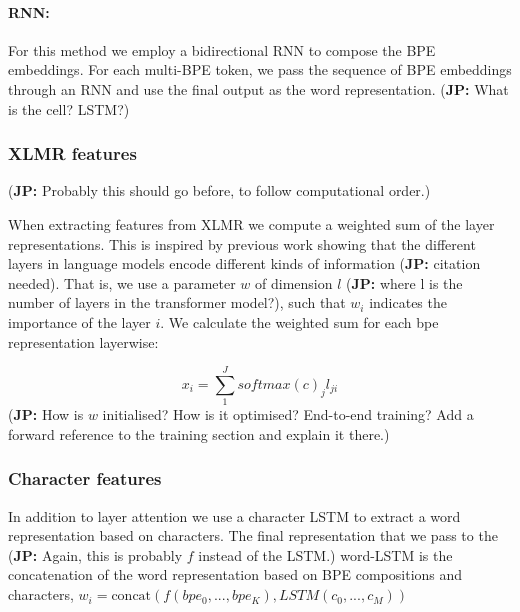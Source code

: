 \documentclass[11pt]{article}
\newcommand\jp[1]{(\textbf{JP:} #1)}
\begin{document}
	
	\paragraph{RNN:} For this method we employ a bidirectional RNN
        to compose the BPE embeddings. For each multi-BPE
        token, we pass the sequence of BPE embeddings through an RNN
        and use the final output as the word representation.
        \jp{What is the cell? LSTM?}
	
	\subsubsection{XLMR features}
        \jp{Probably this should go before, to follow computational order.}
	
	When extracting features from XLMR we compute a weighted sum
        of the layer representations. This is inspired by previous
        work showing that the different layers in language models
        encode different kinds of information \jp{citation
          needed}. That is, we use a parameter $w$ of dimension $l$
        \jp{where l is the number of layers in the transformer
          model?}, such that $w_i$ indicates the importance of the
        layer $i$. We calculate the weighted sum for each bpe
        representation layerwise:
	
	\begin{equation}
		x_i = \sum_{1}^{J} softmax(c)_j l_{ji}
	\end{equation}
	\jp{How is $w$ initialised? How is it optimised? End-to-end
          training? Add a forward reference to the training section and explain it there.}
        
	\subsubsection{Character features}
	In addition to layer attention we use a character LSTM to
        extract a word representation based on characters. The final
        representation that we pass to the \jp{Again, this is probably
          $f$ instead of the LSTM.} word-LSTM is the concatenation of
        the word representation based on BPE compositions and
        characters,
        $w_i = \text{concat}(f(bpe_0,...,bpe_K), LSTM(c_0, ..., c_M))$
	
\end{document}
